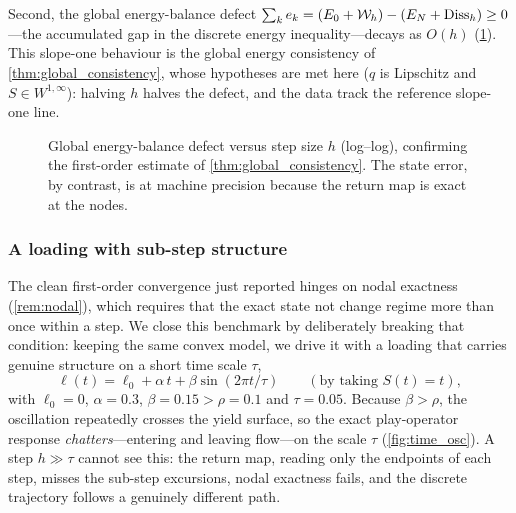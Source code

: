 Second, the global energy-balance defect $\sum_k e_k=(E_0+\mathcal
W_h)-(E_N+\mathrm{Diss}_h)\ge0$---the accumulated gap in the discrete energy
inequality---decays as $O(h)$ (\cref{fig:convergence}). This slope-one
behaviour is the global energy consistency of
\cref{thm:global_consistency}, whose hypotheses are met here ($q$ is
Lipschitz and $S\in W^{1,\infty}$): halving $h$ halves the defect, and
the data track the reference slope-one line.

\begin{figure}[t]
  \centering
  \caption{Global energy-balance defect versus step size $h$
  (log--log), confirming the first-order estimate of
  \cref{thm:global_consistency}. The state error, by contrast, is at
  machine precision because the return map is exact at the nodes.}
  \label{fig:convergence}
\end{figure}

\subsubsection{A loading with sub-step structure}\label{sec:conv_osc}

The clean first-order convergence just reported hinges on nodal exactness
(\cref{rem:nodal}), which requires that the exact state not change regime
more than once within a step. We close this benchmark by deliberately
breaking that condition: keeping the same convex model, we drive it with
a loading that carries genuine structure on a short time scale $\tau$,
\begin{equation}\label{eq:osc_loading}
  \ell(t)=\ell_0+\alpha\,t+\beta\sin(2\pi t/\tau)
  \qquad(\text{by taking }S(t)=t),
\end{equation}
with $\ell_0=0$, $\alpha=0.3$, $\beta=0.15>\rho=0.1$ and $\tau=0.05$.
Because $\beta>\rho$, the oscillation repeatedly crosses the yield
surface, so the exact play-operator response \emph{chatters}---entering
and leaving flow---on the scale $\tau$ (\cref{fig:time_osc}). A step
$h\gg\tau$ cannot see this: the return map, reading only the endpoints of
each step, misses the sub-step excursions, nodal exactness fails, and the
discrete trajectory follows a genuinely different path.

